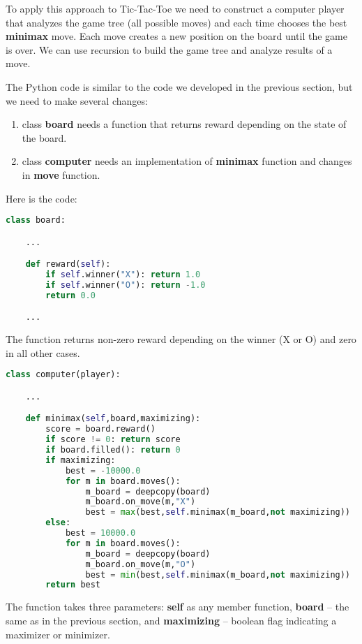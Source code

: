 To apply this approach to Tic-Tac-Toe we need to construct a computer
player that analyzes the game tree (all possible moves) and each time
chooses the best \textbf{minimax} move. Each move creates a new position
on the board until the game is over. We can use recursion to
build the game tree and analyze results of a move.

The Python code is similar to the code we developed in the previous section,
but we need to make several changes:

\begin{enumerate}
\item class \textbf{board} needs a function that returns reward
depending on the state of the board.
\item class \textbf{computer} needs an implementation of \textbf{minimax}
function and changes in \textbf{move} function.
\end{enumerate}

Here is the code:

\begin{lstlisting}[language=Python,style=codelst2,caption={Tic-Tac-Toe: the board, reward function}]
class board:

    ...

    def reward(self):
        if self.winner("X"): return 1.0
        if self.winner("O"): return -1.0
        return 0.0

    ...
\end{lstlisting}
The function returns non-zero reward depending on the winner (X or O)
and zero in all other cases.

\begin{lstlisting}[language=Python,style=codelst2,caption={Tic-Tac-Toe: minimax computer player}]
class computer(player):

    ...

    def minimax(self,board,maximizing):
        score = board.reward()
        if score != 0: return score
        if board.filled(): return 0
        if maximizing:
            best = -10000.0
            for m in board.moves():
                m_board = deepcopy(board)
                m_board.on_move(m,"X")
                best = max(best,self.minimax(m_board,not maximizing))
        else:
            best = 10000.0
            for m in board.moves():
                m_board = deepcopy(board)
                m_board.on_move(m,"O")
                best = min(best,self.minimax(m_board,not maximizing))
        return best
\end{lstlisting}
The function takes three parameters: \textbf{self} as 
any member function, \textbf{board} -- the same as in the previous
section, and \textbf{maximizing} -- boolean flag indicating a
maximizer or minimizer.

